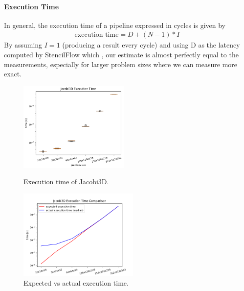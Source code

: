 \paragraph{Execution Time}

In general, the execution time of a pipeline expressed in cycles is given by
\begin{align}
\text{execution time} = D + (N-1)*I
\end{align}
By assuming $I=1$  (producing a result every cycle) and using D as the latency computed by StencilFlow which , our estimate is almost perfectly equal to the measurements, especially for larger problem sizes where we can measure more exact.
\begin{figure}[h]
	\begin{minipage}{.5\columnwidth}
		\centering
		\includegraphics[height=12em]{plots/jacobi3d_execution_time.png}
		\caption{Execution time of Jacobi3D.}
		\label{fig:jacobi3d_execution_time}
	\end{minipage}
	\begin{minipage}{.5\columnwidth}
		\centering
		\includegraphics[height=12em]{plots/jacobi3d_execution_time_comparison.png}
		\caption{Expected vs actual execution time.}
		\label{fig:jacobi3d_execution_time}
	\end{minipage}
\end{figure}

